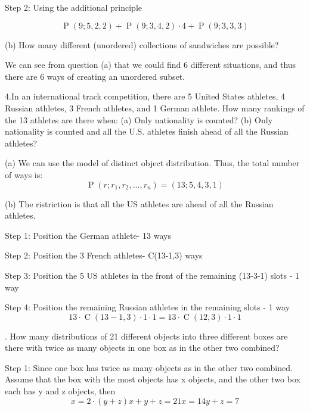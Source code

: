 \documentclass[12pt]{amsart}
\DeclareMathOperator{\perm}{P}
\DeclareMathOperator{\comb}{C}
\begin{document}
Step 2: Using the additional principle 

\begin{displaymath}
\perm(9;5,2,2)+ \perm(9;3,4,2)\cdot4 +\perm(9;3,3,3)
\end{displaymath}

\smallskip

(b) How many different (unordered) collections of sandwiches are possible?
\smallskip

We can see from question (a) that we could find 6 different situations, and thus there are 6 ways of creating an unordered subset. 
\bigskip


4.In an international track competition, there are 5 United States athletes, 4
Russian athletes, 3 French athletes, and 1 German athlete. How many rankings
of the 13 athletes are there when:
(a) Only nationality is counted?
(b) Only nationality is counted and all the U.S. athletes finish ahead of all the
Russian athletes?
\bigskip

(a) We can use the model of distinct object distribution. Thus, the total number of ways is: 
\begin{displaymath}
\perm(r;r_1,r_2,...,r_n)= (13; 5,4,3,1)
\end{displaymath}
\smallskip

(b) The ristriction is that all the US athletes are ahead of all the Russian athletes. 
\smallskip

Step 1: Position the German athlete- 13 ways 
\smallskip

Step 2: Position the 3 French athletes- C(13-1,3) ways 
\smallskip

Step 3: Position the 5 US athletes in the front of the remaining (13-3-1) slots - 1 way
\smallskip

Step 4: Position the remaining Russian athletes in the remaining slots - 1 way
\begin{displaymath}
13\cdot\comb(13-1,3)\cdot 1\cdot 1=13\cdot\comb(12,3)\cdot 1\cdot 1
\end{displaymath}

. How many distributions of 21 different objects into three different boxes are
there with twice as many objects in one box as in the other two combined?
\smallskip

Step 1: Since one box has twice as many objects as in the other two combined. Assume that the box with the most objects has x objects, and the other two box each has y and z objects, then
\begin{displaymath}
x = 2\cdot (y + z)
x + y + z = 21
x = 14 
y + z = 7
\end{displaymath}
\end{document}
